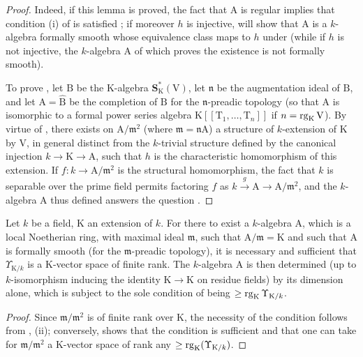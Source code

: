 \begin{proof}
Indeed, if this lemma is proved, the fact that $\mathrm{A}$ is regular implies that condition (i) of  is satisfied ; if moreover $h$ is injective,  will show that $\mathrm{A}$ is a $k$-algebra formally smooth whose equivalence class maps to $h$ under  (while if $h$ is not injective, the $k$-algebra $\mathrm{A}$ of which  proves the existence is not formally smooth).

To prove , let $\mathrm{B}$ be the $\mathrm{K}$-algebra $\mathbf{S}^*_\mathrm{K}(\mathrm{V})$, let $\mathfrak{n}$ be the augmentation ideal of $\mathrm{B}$, and let $\mathrm{A}=\widehat{\mathrm{B}}$ be the completion of $\mathrm{B}$ for the $\mathfrak{n}$-preadic topology (so that $\mathrm{A}$ is isomorphic to a formal power series algebra $\mathrm{K}[[\mathrm{T}_1,\ldots,\mathrm{T}_n]]$ if $n=\operatorname{rg}_\mathrm{K}\mathrm{V}$).
By virtue of , there exists on $\mathrm{A}/\mathfrak{m}^2$ (where $\mathfrak{m}=\mathfrak{n}\mathrm{A}$) a structure of $k$-extension of $\mathrm{K}$ by $\mathrm{V}$, in general distinct from the $k$-trivial structure defined by the canonical injection $k\to\mathrm{K}\to\mathrm{A}$, such that $h$ is the characteristic homomorphism of this extension.
If $f:k\to\mathrm{A}/\mathfrak{m}^2$ is the structural homomorphism, the fact that $k$ is separable over the prime field permits  factoring $f$ as $k\xrightarrow{g}\mathrm{A}\to\mathrm{A}/\mathfrak{m}^2$, and the $k$-algebra $\mathrm{A}$ thus defined answers the question .
\end{proof}

\begin{theorem}[22.2.6]
\label{0.22.2.6}
Let $k$ be a field, $\mathrm{K}$ an extension of $k$.
For there to exist a $k$-algebra $\mathrm{A}$, which is a local Noetherian ring, with maximal ideal $\mathfrak{m}$, such that $\mathrm{A}/\mathfrak{m}=\mathrm{K}$ and such that $\mathrm{A}$ is formally smooth (for the $\mathfrak{m}$-preadic topology), it is necessary and sufficient that $\Upsilon_{\mathrm{K}/k}$ is a $\mathrm{K}$-vector space of finite rank.
The $k$-algebra $\mathrm{A}$ is then determined (up to $k$-isomorphism inducing the identity $\mathrm{K}\to\mathrm{K}$ on residue fields) by its dimension alone, which is subject to the sole condition of being $\geq\operatorname{rg}_\mathrm{K}\Upsilon_{\mathrm{K}/k}$.
\end{theorem}

\begin{proof}
Since $\mathfrak{m}/\mathfrak{m}^2$ is of finite rank over $\mathrm{K}$, the necessity of the condition follows from , (ii); conversely,  shows that the condition is sufficient and that one can take for $\mathfrak{m}/\mathfrak{m}^2$ a $\mathrm{K}$-vector space of rank any $\geq\operatorname{rg}_\mathrm{K}(\Upsilon_{\mathrm{K}/k})$.
\end{proof}

